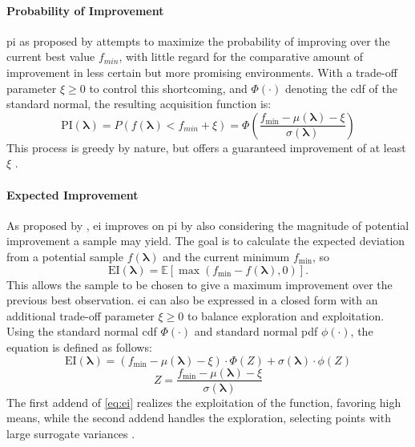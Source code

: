 \paragraph{Probability of Improvement}
\gls{pi} as proposed by \citet{kushner1964new} attempts to maximize the probability of improving over the current best value $f_{min}$, with little regard for the comparative amount of improvement in less certain but more promising environments. With a trade-off parameter $\xi \geq 0$ to control this shortcoming, and $\Phi(\cdot)$ denoting the  \gls{cdf} of the standard normal, the resulting acquisition function is:
\begin{equation}
	\text{PI}(\mathbf{\lambda}) = P(f(\mathbf{\lambda}) < f_{min} + \xi)  
	= \Phi \left(  \frac{f_\text{min} - \mu(\mathbf{\lambda}) - \xi}{\sigma(\mathbf{\lambda})} \right) 
\end{equation}
This process is greedy by nature, but offers a guaranteed improvement of at least $\xi$ \cite{brochu2010tutorial}.

\paragraph{Expected Improvement}
As proposed by \citet{jones1998efficient}, \gls{ei} improves on \gls{pi} by also considering the magnitude of potential improvement a sample may yield. The goal is to calculate the expected deviation from a potential sample $f(\mathbf{\lambda})$ and the current minimum $f_\text{min}$, so
\begin{equation}
	\text{EI}(\mathbf{\lambda}) = \mathbb{E}[\max(f_\text{min}-f(\mathbf{\lambda}),0)].
\end{equation}
This allows the sample to be chosen to give a maximum improvement over the previous best observation.
\gls{ei} can also be expressed in a closed form with an additional trade-off parameter $\xi \geq 0$ to balance exploration and exploitation. Using the standard normal \gls{cdf} $\Phi(\cdot)$ and standard normal \gls{pdf} $\phi(\cdot)$, the equation is defined as follows:
\begin{equation}
	\label{eq:ei}
	\text{EI}(\mathbf{\lambda}) = (f_\text{min} - \mu(\mathbf{\lambda}) - \xi) \cdot \Phi(Z)+\sigma(\mathbf{\lambda})\cdot \phi(Z) 
\end{equation} 
$$
Z =  \frac{f_\text{min} - \mu(\mathbf{\lambda}) - \xi}{\sigma(\mathbf{\lambda})} 
$$
The first addend of \cref{eq:ei} realizes the exploitation of the function, favoring high means, while the second addend handles the exploration, selecting points with large surrogate variances \cite{brochu2010tutorial}.


